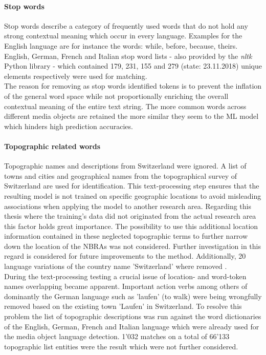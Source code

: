 \paragraph*{Stop words}
Stop words describe a category of frequently used words that do not hold any strong contextual meaning which occur in every language. Examples for the English language are for instance the words: while, before, because, theirs.\\
English, German, French and Italian stop word lists - also provided by the \textit{nltk} Python library - which contained 179, 231, 155 and 279 (state: 23.11.2018) unique elements respectively were used for matching.\\
The reason for removing as stop words identified tokens is to prevent the inflation of the general word space while not proportionally enriching the overall contextual meaning of the entire text string. The more common words across different media objects are retained the more similar they seem to the ML model which hinders high prediction accuracies.

\paragraph*{Topographic related words}
Topographic names and descriptions from Switzerland were ignored. A list of towns and cities \parencite{Swisstopo2018} and geographical names from the topographical survey of Switzerland \parencite{Swisstopo2018a} are used for identification. This text-processing step ensures that the resulting model is not trained on specific geographic locations to avoid misleading associations when applying the model to another research area. Regarding this thesis where the training's data did not originated from the actual research area this factor holds great importance. 
The possibility to use this additional location information contained in these neglected topographic terms to further narrow down the location of the NBRAs was not considered. Further investigation in this regard is considered for future improvements to the method. Additionally, 20 language variations of the country name 'Switzerland' where removed \parencite{101languages2018}. \\
During the text-processing testing a crucial issue of location- and word-token names overlapping became apparent. Important action verbs among others of dominantly the German language such as 'laufen' (to walk) were being wrongfully removed based on the existing town 'Laufen' in Switzerland. To resolve this problem the list of topographic descriptions was run against the word dictionaries of the English, German, French and Italian language which were already used for the media object language detection. 1'032 matches on a total of 66'133 topographic list entities were the result which were not further considered.

